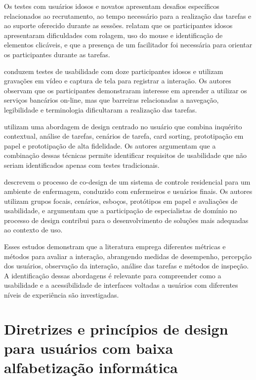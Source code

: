 \label{sec:testes}

Os testes com usuários idosos e novatos apresentam desafios específicos relacionados ao recrutamento, ao tempo necessário para a realização das tarefas e ao suporte oferecido durante as sessões. \cite{xie2010usability} relatam que os participantes idosos apresentaram dificuldades com rolagem, uso do mouse e identificação de elementos clicáveis, e que a presença de um facilitador foi necessária para orientar os participantes durante as tarefas.

\cite{gatsou2017seniors} conduzem testes de usabilidade com doze participantes idosos e utilizam gravações em vídeo e captura de tela para registrar a interação. Os autores observam que os participantes demonstraram interesse em aprender a utilizar os serviços bancários on-line, mas que barreiras relacionadas a navegação, legibilidade e terminologia dificultaram a realização das tarefas.

\cite{balakrishnan2012user} utilizam uma abordagem de design centrado no usuário que combina inquérito contextual, análise de tarefas, cenários de tarefa, card sorting, prototipação em papel e prototipação de alta fidelidade. Os autores argumentam que a combinação dessas técnicas permite identificar requisitos de usabilidade que não seriam identificados apenas com testes tradicionais.

\cite{kymäläinen2012creating} descrevem o processo de co-design de um sistema de controle residencial para um ambiente de enfermagem, conduzido com enfermeiros e usuários finais. Os autores utilizam grupos focais, cenários, esboços, protótipos em papel e avaliações de usabilidade, e argumentam que a participação de especialistas de domínio no processo de design contribui para o desenvolvimento de soluções mais adequadas ao contexto de uso.

Esses estudos demonstram que a literatura emprega diferentes métricas e métodos para avaliar a interação, abrangendo medidas de desempenho, percepção dos usuários, observação da interação, análise das tarefas e métodos de inspeção. A identificação dessas abordagens é relevante para compreender como a usabilidade e a acessibilidade de interfaces voltadas a usuários com diferentes níveis de experiência são investigadas.

\section{Diretrizes e princípios de design para usuários com baixa alfabetização informática}

